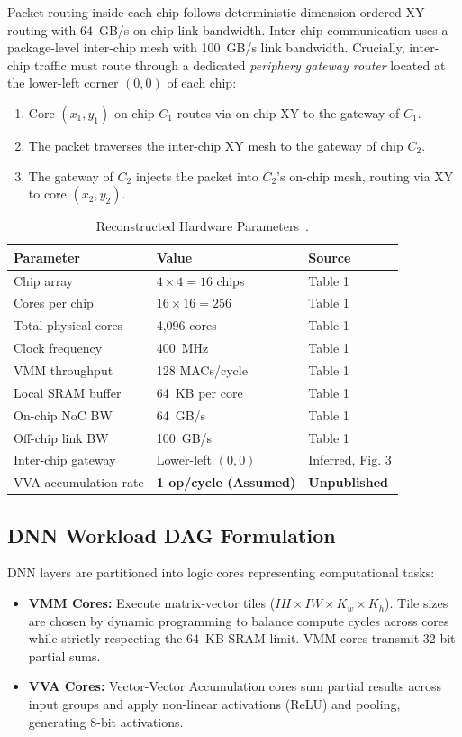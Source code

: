 \documentclass[10pt,conference]{IEEEtran}
\begin{document}
Packet routing inside each chip follows deterministic dimension-ordered XY routing with 64~GB/s on-chip link bandwidth. Inter-chip communication uses a package-level inter-chip mesh with 100~GB/s link bandwidth. Crucially, inter-chip traffic must route through a dedicated \emph{periphery gateway router} located at the lower-left corner $(0,0)$ of each chip:
\begin{enumerate}
  \item Core $(x_1, y_1)$ on chip $C_1$ routes via on-chip XY to the gateway of $C_1$.
  \item The packet traverses the inter-chip XY mesh to the gateway of chip $C_2$.
  \item The gateway of $C_2$ injects the packet into $C_2$'s on-chip mesh, routing via XY to core $(x_2, y_2)$.
\end{enumerate}

\begin{table}[t]
  \caption{Reconstructed Hardware Parameters~\cite{wu2020todaes}.}
  \label{tab:hardware}
  \centering
  \footnotesize
  \setlength{\tabcolsep}{3pt}
  \begin{tabularx}{\columnwidth}{l l X}
    \toprule
    Parameter & Value & Source \\
    \midrule
    Chip array & $4 \times 4 = 16$ chips & Table 1~\cite{wu2020todaes} \\
    Cores per chip & $16 \times 16 = 256$ & Table 1 \\
    Total physical cores & 4,096 cores & Table 1 \\
    Clock frequency & 400~MHz & Table 1 \\
    VMM throughput & 128 MACs/cycle & Table 1 \\
    Local SRAM buffer & 64~KB per core & Table 1 \\
    On-chip NoC BW & 64~GB/s & Table 1 \\
    Off-chip link BW & 100~GB/s & Table 1 \\
    Inter-chip gateway & Lower-left $(0,0)$ & Inferred, Fig. 3 \\
    VVA accumulation rate & \textbf{1 op/cycle (Assumed)} & \textbf{Unpublished} \\
    \bottomrule
  \end{tabularx}
\end{table}

\subsection{DNN Workload DAG Formulation}
DNN layers are partitioned into logic cores representing computational tasks:
\begin{itemize}
  \item \textbf{VMM Cores:} Execute matrix-vector tiles ($IH \times IW \times K_w \times K_h$). Tile sizes are chosen by dynamic programming to balance compute cycles across cores while strictly respecting the 64~KB SRAM limit. VMM cores transmit 32-bit partial sums.
  \item \textbf{VVA Cores:} Vector-Vector Accumulation cores sum partial results across input groups and apply non-linear activations (ReLU) and pooling, generating 8-bit activations.
\end{itemize}
\end{document}
